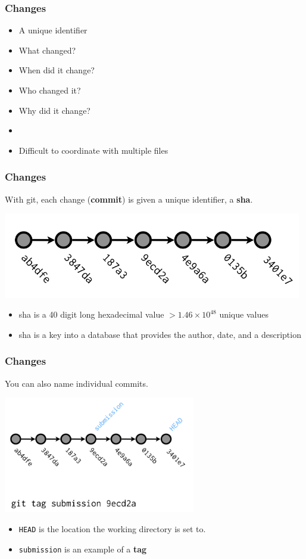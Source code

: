   \begin{frame}[t]
    \frametitle{Changes}
    \begin{itemize}
      \item A unique identifier
      \item What changed?
      \item When did it change?
      \item Who changed it?
      \item Why did it change?
      \item[]
      \item Difficult to coordinate with multiple files
    \end{itemize}
  \end{frame}

  \begin{frame}[t]
    \frametitle{Changes}
    With git, each change ({\bf commit}) is given a unique identifier, a {\bf
    sha}.
    \begin{center}
      \includegraphics[width=0.98\textwidth]{../images/from-wickham-02.png} 
    \end{center} 

    \begin{itemize} 
      \item sha is a 40 digit long hexadecimal value $> 1.46 \times 10^{48}$
        unique values
      \item sha is a key into a database that provides the author, date, and a
        description
    \end{itemize} 
  \end{frame}

  \begin{frame}[t]
    \frametitle{Changes}
    You can also name individual commits.
    \begin{center}
      \includegraphics[height=2.00in]{../images/from-wickham-03.png} 
    \end{center} 

    \begin{itemize} 
      \item {\tt HEAD} is the location the working directory is set to.
      \item {\tt submission} is an example of a {\bf tag}
    \end{itemize} 
  \end{frame}

